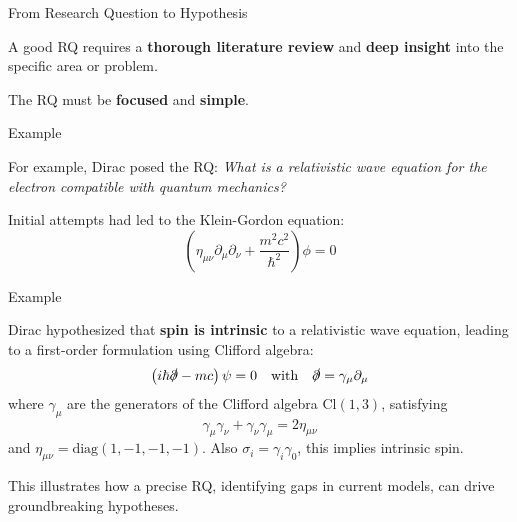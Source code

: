 \begin{frame}{From Research Question to Hypothesis}
  \begin{block}{}
    \onslide<+-> A good RQ requires a \textbf{thorough literature review} and
    \textbf{deep insight} into the specific area or problem.

    \vspace{0.3cm}

    \onslide<+-> The RQ must be \textbf{focused} and \textbf{simple}.

  \end{block}
\end{frame}

\begin{frame}{Example}
  \begin{block}{}

    \onslide<+-> For example, Dirac posed the RQ:
    \textit{What is a relativistic wave equation for the electron compatible
    with quantum mechanics?}

    \vspace{0.3cm}

    \onslide<+-> Initial attempts had led to the Klein-Gordon equation:
    \[
      \left( \eta_{\mu\nu} \partial_\mu \partial_\nu + \frac{m^2 c^2}{\hbar^2} \right) \phi = 0
    \]

  \end{block}
\end{frame}

\begin{frame}{Example}
  \begin{block}{}

    \onslide<+-> Dirac hypothesized that \textbf{spin is intrinsic} to a
    relativistic wave equation, leading to a first-order formulation using Clifford algebra:
    \[
      \left( i \hbar \slashed{\partial} - m c \right) \psi = 0
      \quad \text{with} \quad
      \slashed{\partial} = \gamma_\mu \partial_\mu
    \]
    where \( \gamma_\mu \) are the generators of the Clifford algebra \(\text{Cl}(1,3)\),
    satisfying
    \[
      \gamma_\mu \gamma_\nu + \gamma_\nu \gamma_\mu = 2 \eta_{\mu\nu}
    \]
    and \(\eta_{\mu\nu} = \mathrm{diag}(1, -1, -1, -1)\).
    Also \( \sigma_i = \gamma_i \gamma_0 \), this implies intrinsic spin.

    \vspace{0.3cm}

    \onslide<+-> This illustrates how a precise RQ, identifying gaps in current
    models, can drive groundbreaking hypotheses.
  \end{block}
\end{frame}

